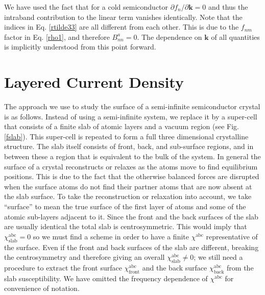 We have used the fact that for a cold semiconductor $\partial f_{n}/\partial
\mathbf{k}=0$ and thus the intraband contribution to the linear term vanishes
identically. Note that the indices in Eq. \eqref{rtilde33} are all different
from each other. This is due to the $f_{nm}$ factor in Eq. \eqref{rho1}, and
therefore $B^a_{nn}=0$. The dependence on $\mathbf{k}$ of all quantities is
implicitly understood from this point forward.


\section{Layered Current Density}\label{cd}

The approach we use to study the surface of a semi-infinite semiconductor
crystal is as follows. Instead of using a semi-infinite system, we replace it by
a super-cell that consists of a finite slab of atomic layers and a vacuum region
(see Fig. \ref{fslab}). This super-cell is repeated to form a full three
dimensional crystalline structure. The slab itself consists of front, back, and
sub-surface regions, and in between these a region that is equivalent to the
bulk of the system. In general the surface of a crystal reconstructs or relaxes
as the atoms move to find equilibrium positions. This is due to the fact that
the otherwise balanced forces are disrupted when the surface atoms do not find
their partner atoms that are now absent at the slab surface. To take the
reconstruction or relaxation into account, we take ``surface'' to mean the true
surface of the first layer of atoms and some of the atomic sub-layers adjacent
to it. Since the front and the back surfaces of the slab are usually identical
the total slab is centrosymmetric. This would imply that
$\chi^{\mathrm{abc}}_{\mathrm{slab}}=0$ so we must find a scheme in order to
have a finite $\chi^{\mathrm{abc}}$ representative of the surface. Even if the
front and back surfaces of the slab are different, breaking the centrosymmetry
and therefore giving an overall $\chi^{\mathrm{abc}}_{\mathrm{slab}}\ne 0$; we
still need a procedure to extract the front surface
$\chi^{\mathrm{abc}}_{\mathrm{front}}$ and the back surface
$\chi^{\mathrm{abc}}_{\mathrm{back}}$ from the slab susceptibility. We have
omitted the frequency dependence of $\chi^{\mathrm{abc}}$ for convenience of
notation.

